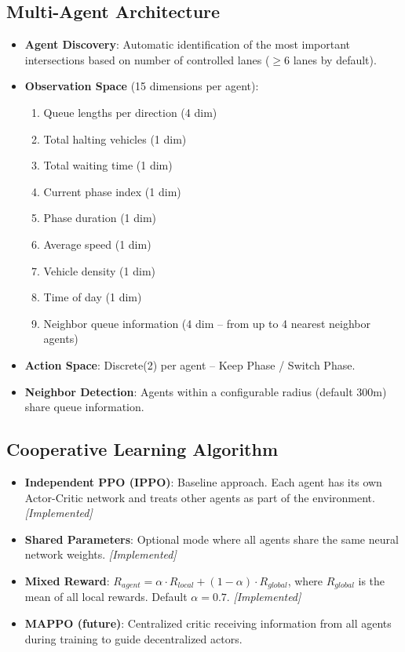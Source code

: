 \documentclass[a4paper,11pt]{article}
\begin{document}
\subsection{Multi-Agent Architecture}
\begin{itemize}
    \item \textbf{Agent Discovery}: Automatic identification of the most important intersections based on number of controlled lanes ($\geq 6$ lanes by default).
    \item \textbf{Observation Space} (15 dimensions per agent):
    \begin{enumerate}
        \item Queue lengths per direction (4 dim)
        \item Total halting vehicles (1 dim)
        \item Total waiting time (1 dim)
        \item Current phase index (1 dim)
        \item Phase duration (1 dim)
        \item Average speed (1 dim)
        \item Vehicle density (1 dim)
        \item Time of day (1 dim)
        \item Neighbor queue information (4 dim -- from up to 4 nearest neighbor agents)
    \end{enumerate}
    \item \textbf{Action Space}: Discrete(2) per agent -- Keep Phase / Switch Phase.
    \item \textbf{Neighbor Detection}: Agents within a configurable radius (default 300m) share queue information.
\end{itemize}

\subsection{Cooperative Learning Algorithm}
\begin{itemize}
    \item \textbf{Independent PPO (IPPO)}: Baseline approach. Each agent has its own Actor-Critic network and treats other agents as part of the environment. \textit{[Implemented]}
    \item \textbf{Shared Parameters}: Optional mode where all agents share the same neural network weights. \textit{[Implemented]}
    \item \textbf{Mixed Reward}: $R_{agent} = \alpha \cdot R_{local} + (1-\alpha) \cdot R_{global}$, where $R_{global}$ is the mean of all local rewards. Default $\alpha = 0.7$. \textit{[Implemented]}
    \item \textbf{MAPPO (future)}: Centralized critic receiving information from all agents during training to guide decentralized actors.
\end{itemize}
\end{document}
